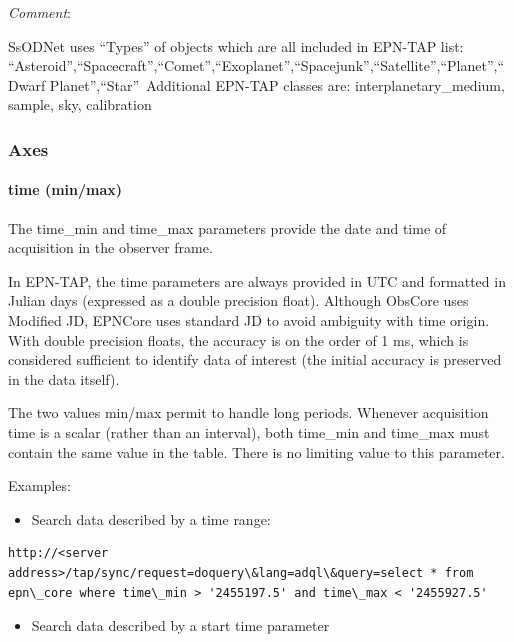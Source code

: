 \documentclass[11pt,a4paper]{ivoa}
\begin{document}
\emph{Comment}: 

SsODNet uses ``Types'' of objects which are all included in EPN-TAP list: ``Asteroid'',``Spacecraft'',``Comet'',``Exoplanet'',``Spacejunk'',``Satellite'',``Planet'',``Dwarf Planet'',``Star'' Additional EPN-TAP classes are: interplanetary\_medium, sample, sky, calibration \\

\subsubsection{Axes \\}

\paragraph{time (min/max)}

The time\_min and time\_max parameters provide the date and time of acquisition in the observer frame. 

In EPN-TAP, the time parameters are always provided in UTC and formatted in Julian days (expressed as a double precision float). Although ObsCore uses Modified JD, EPNCore uses standard JD to avoid ambiguity with time origin. With double precision floats, the accuracy is on the order of 1 ms, which is considered sufficient to identify data of interest (the initial accuracy is preserved in the data itself).

The two values min/max permit to handle long periods. Whenever acquisition time is a scalar (rather than an interval), both time\_min and time\_max must contain the same value in the table. There is no limiting value to this parameter.

Examples:

\begin{itemize}
\item Search data described by a time range:
\end{itemize}






\begin{verbatim}http://<server address>/tap/sync/request=doquery\&lang=adql\&query=select * from epn\_core where time\_min > '2455197.5' and time\_max < '2455927.5'\end{verbatim}




\begin{itemize}
\item Search data described by a start time parameter
\end{itemize}
\end{document}
